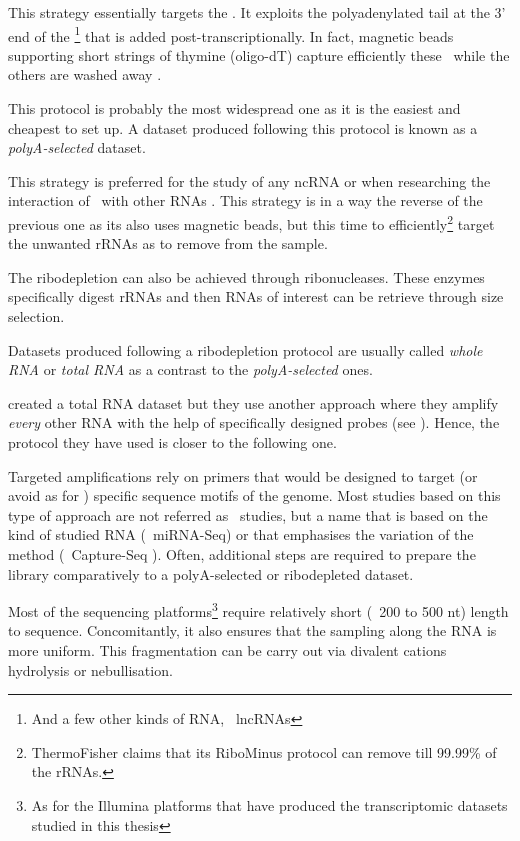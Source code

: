 This strategy essentially targets the \mRNAs. It exploits the polyadenylated
tail at the 3' end of the \mRNAs\footnote{And a few other kinds of \gls{RNA},
\eg\ \glspl{lncRNA} } that is added
post-transcriptionally. In fact, magnetic beads supporting short
strings of thymine (oligo-dT) capture efficiently these \mRNAs\ while the others
are washed away .

This protocol is probably the most widespread one as it is the easiest and
cheapest to set up. A dataset produced following this protocol is known as
a \emph{polyA-selected} dataset.

This strategy is preferred for the study of any \gls{ncRNA} or when researching
the interaction of \mRNAs\ with other \glspl{RNA} . This
strategy is in a way the reverse of the previous one as its also
uses magnetic beads, but this time to efficiently\footnote{ThermoFisher claims
that its RiboMinus protocol can remove till 99.99\% of the \glspl{rRNA}.}
target the unwanted \glspl{rRNA} as to remove from the sample.

The ribodepletion can also be achieved through ribonucleases. These enzymes
specifically digest \glspl{rRNA} and then \glspl{RNA} of interest can be retrieve
through size selection.

Datasets produced following a ribodepletion protocol are usually called
\emph{whole \gls{RNA}} or \emph{total \gls{RNA}} as a contrast to the
\emph{polyA-selected} ones.

\cite{castleData} created a total \gls{RNA} dataset but they use another
approach where they amplify \emph{every} other \gls{RNA} with the help of
specifically designed probes (see ). Hence,
the protocol they have used is closer to the following one.

Targeted amplifications rely on primers that would be designed to target (or
avoid as for \cite{castleData}) specific sequence motifs of the genome. Most
studies based on this type of approach are not referred as \Rnaseq\ studies, but
a name that is based on the kind of studied \gls{RNA} (\eg\ \gls{miRNA-Seq}) or
that emphasises the variation of the method (\eg\ Capture-Seq
). Often, additional steps are required to prepare the
library comparatively to a polyA-selected or ribodepleted dataset.


Most of the sequencing platforms\footnote{As for the Illumina platforms that have
produced the transcriptomic datasets studied in this thesis} require relatively
short (\eg\ 200 to 500 nt) length to sequence. Concomitantly, it also ensures
that the sampling along the \gls{RNA} is more uniform.
This fragmentation can be carry out via divalent cations hydrolysis or
nebullisation.

